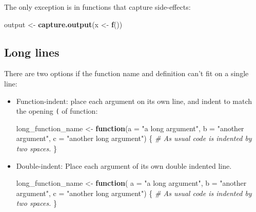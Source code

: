 \documentclass[
]{book}
\newenvironment{Shaded}{\begin{snugshade}}{\end{snugshade}}
\newcommand{\CommentTok}[1]{\textcolor[rgb]{0.56,0.35,0.01}{\textit{#1}}}
\newcommand{\ControlFlowTok}[1]{\textcolor[rgb]{0.13,0.29,0.53}{\textbf{#1}}}
\newcommand{\DataTypeTok}[1]{\textcolor[rgb]{0.13,0.29,0.53}{#1}}
\newcommand{\KeywordTok}[1]{\textcolor[rgb]{0.13,0.29,0.53}{\textbf{#1}}}
\newcommand{\NormalTok}[1]{#1}
\newcommand{\StringTok}[1]{\textcolor[rgb]{0.31,0.60,0.02}{#1}}
\begin{document}
The only exception is in functions that capture side-effects:

\begin{Shaded}
\begin{Highlighting}[]
\NormalTok{output <-}\StringTok{ }\KeywordTok{capture.output}\NormalTok{(x <-}\StringTok{ }\KeywordTok{f}\NormalTok{())}
\end{Highlighting}
\end{Shaded}

\hypertarget{long-lines}{%
\subsection{Long lines}\label{long-lines}}

There are two options if the function name and definition can't fit on a single
line:

\begin{itemize}
\item
  Function-indent: place each argument on its own line, and indent to match
  the opening \texttt{(} of function:

\begin{Shaded}
\begin{Highlighting}[]
\NormalTok{long_function_name <-}\StringTok{ }\ControlFlowTok{function}\NormalTok{(}\DataTypeTok{a =} \StringTok{"a long argument"}\NormalTok{,}
                               \DataTypeTok{b =} \StringTok{"another argument"}\NormalTok{,}
                               \DataTypeTok{c =} \StringTok{"another long argument"}\NormalTok{) \{}
  \CommentTok{# As usual code is indented by two spaces.}
\NormalTok{\}}
\end{Highlighting}
\end{Shaded}
\item
  Double-indent: Place each argument of its own double indented line.

\begin{Shaded}
\begin{Highlighting}[]
\NormalTok{long_function_name <-}\StringTok{ }\ControlFlowTok{function}\NormalTok{(}
    \DataTypeTok{a =} \StringTok{"a long argument"}\NormalTok{,}
    \DataTypeTok{b =} \StringTok{"another argument"}\NormalTok{,}
    \DataTypeTok{c =} \StringTok{"another long argument"}\NormalTok{) \{}
    \CommentTok{# As usual code is indented by two spaces.}
\NormalTok{\}}
\end{Highlighting}
\end{Shaded}
\end{itemize}
\end{document}
